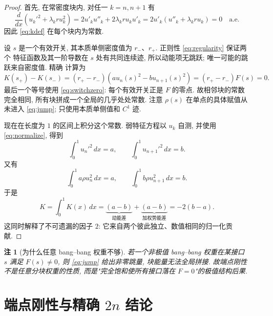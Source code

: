 \documentclass[UTF8]{ctexart}
\newtheorem{remark}[theorem]{注}
\begin{document}
\begin{proof}
首先, 在常密度块内, 对任一 $k=n,n+1$ 有
\begin{equation}
	\frac{d}{dx}\left(u_k'^2+\lambda_k r u_k^2\right)
		=2u'_ku''_k+2\lambda_k r u_ku'_k
		=2u'_k(u''_k+\lambda_k r u_k)=0\quad\text{a.e.}
	\label{eq:blockconst}
\end{equation}
因此 \eqref{eq:kdef} 在每个块内为常数.

设 $s$ 是一个有效开关, 其本质单侧密度值为 $r_-$、$r_+$. 正则性 \eqref{eq:regularity} 保证两个
特征函数及其一阶导数在 $s$ 处有共同连续迹, 所以动能项无跳跃; 唯一可能的跳跃来自密度值. 精确
计算为
\begin{equation}
	K(s_+)-K(s_-)=(r_+-r_-)\left(au_n(s)^2-bu_{n+1}(s)^2\right)
		=(r_+-r_-)F(s)=0 .
	\label{eq:jump}
\end{equation}
最后一个等号使用 \eqref{eq:switchzero}: 每个有效开关正是 $F$ 的零点. 故相邻块的常数完全相同,
所有块拼成一个全局的几乎处处常数. 注意 $\rho(s)$ 在单点的具体赋值从未进入 \eqref{eq:jump};
只使用本质单侧值和 $C^1$ 迹.

现在在长度为 $1$ 的区间上积分这个常数. 弱特征方程以 $u_k$ 自测, 并使用 \eqref{eq:normalize},
得到
\begin{equation}
	\int_0^1u_n'^2\,dx=a,\qquad \int_0^1u_{n+1}'^2\,dx=b .
	\label{eq:kinetic}
\end{equation}
又有
\begin{equation}
	\int_0^1a\rho u_n^2\,dx=a,\qquad \int_0^1b\rho u_{n+1}^2\,dx=b .
	\label{eq:potential}
\end{equation}
于是
\begin{equation}
	K=\int_0^1K(x)\,dx
		=\underbrace{(a-b)}_{\text{动能差}}+\underbrace{(a-b)}_{\text{加权势能差}}
		=-2(b-a) .
	\label{eq:kintegral}
\end{equation}
这同时解释了不可遗漏的因子 $2$: 它来自两个彼此独立、数值相同的归一化贡献.
\end{proof}

\begin{remark}[为什么任意 bang--bang 权重不够]\label{rem:bangbang}
若一个非极值 bang--bang 权重在某接口 $s$ 满足 $F(s)\ne0$, 则 \eqref{eq:jump} 给出非零跳量,
块能量无法全局拼接. 故端点刚性不是任意分块权重的性质, 而是"完全饱和使所有接口落在
$F=0$"的极值结构后果.
\end{remark}

\section{端点刚性与精确 \texorpdfstring{$2n$}{2n} 结论}
\end{document}
